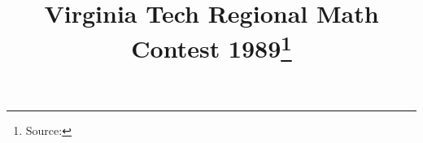 \documentclass[10pt]{article}
\begin{document}
\title{Virginia Tech Regional Math Contest 1989\footnote{Source: \source}}
\author{\vspace{-2ex}}
\date{\vspace{-6ex}} %
\maketitle








\end{document}
